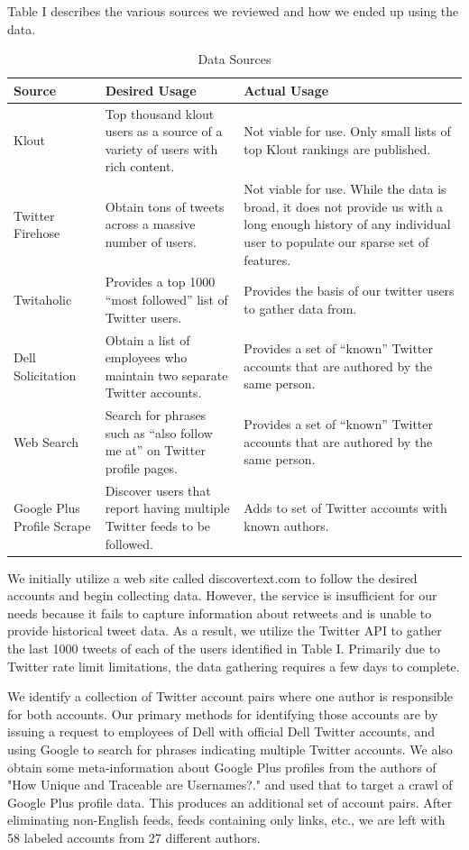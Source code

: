 \documentclass[10pt, conference, compsocconf]{IEEEtran}
\begin{document}
Table I describes the various sources we reviewed and how we ended up using the data.
\begin{table}[!h]
  \centering
  \begin{tabularx}{\linewidth}{X X X}
    \toprule
    \bf{Source} & \bf{Desired Usage} & \bf{Actual Usage} \\ \midrule
    Klout & Top thousand klout users as a source of a variety of users with rich content. & Not viable for use. Only small lists of top Klout rankings are published. \\ \midrule
    Twitter Firehose & Obtain tons of tweets across a massive number of users. & Not viable for use. While the data is broad, it does not provide us with a long enough history of any individual user to populate our sparse set of features. \\ \midrule
    Twitaholic & Provides a top 1000 “most followed” list of Twitter users. & Provides the basis of our twitter users to gather data from. \\ \midrule
    Dell Solicitation & Obtain a list of employees who maintain two separate Twitter accounts. & Provides a set of “known” Twitter accounts that are authored by the same person. \\ \midrule
    Web Search & Search for phrases such as “also follow me at” on Twitter profile pages. & Provides a set of “known” Twitter accounts that are authored by the same person. \\ \midrule
    Google Plus Profile Scrape & Discover users that report having multiple Twitter feeds to be followed. & Adds to set of Twitter accounts with known authors. \\
    \bottomrule
  \end{tabularx}
  \caption{Data Sources}
\end{table}
We initially utilize a web site called discovertext.com to follow the
desired accounts and begin collecting data. However, the service
is insufficient for our needs because it fails to capture
information about retweets and is unable to provide historical tweet
data. As a result, we utilize the Twitter API to gather the last 1000
tweets of each of the users identified in Table I. Primarily due to
Twitter rate limit limitations, the data gathering requires a few days to
complete.

We identify a collection of Twitter account pairs where one author
is responsible for both accounts. Our primary methods for identifying
those accounts are by issuing a request to employees of Dell with official Dell
Twitter accounts, and using Google to search for phrases indicating
multiple Twitter accounts. We also obtain some meta-information
about Google Plus profiles from the authors of "How Unique and Traceable are Usernames?." \cite{Perito} and used
that to target a crawl of Google Plus profile data. This produces an
additional set of account pairs. After eliminating non-English feeds,
feeds containing only links, etc., we are left with 58 labeled
accounts from 27 different authors.
\end{document}
